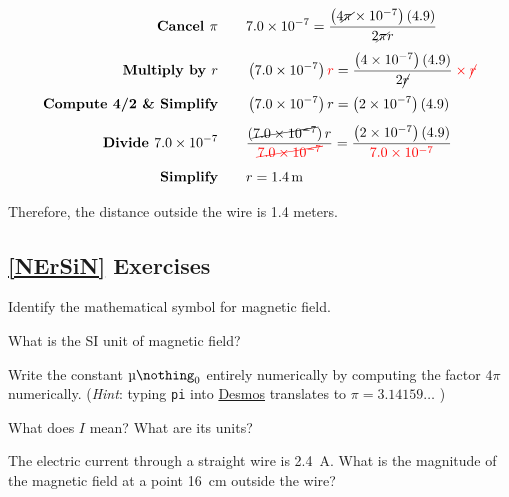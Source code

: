 \documentclass[main.tex]{subfiles}
\begin{document}
\begin{align*}
    \textbf{Cancel $\pi$} \qquad &  \num{7.0e-7} = \frac{\left(4\cancel{\pi} \times 10^{-7}\right) (4.9)}{2\cancel{\pi} r}\\[1ex]
    \textbf{Multiply by $r$} \qquad & \left(\num{7.0e-7}\right) \textcolor{red}{r} = \frac{\left(4 \times 10^{-7}\right) (4.9)}{2\cancel{r}} \mathbin{\color{red} \times} \textcolor{red}{\cancel{r}}\\[1ex]
    \textbf{Compute 4/2 \& Simplify} \qquad & \left(\num{7.0e-7}\right) r = \left(\num{2e-7}\right) (4.9)\\[1ex]
    \textbf{Divide \num{7.0e-7}} \qquad & \frac{\left(\cancel{\num{7.0e-7}}\right) r}{\textcolor{red}{\cancel{\num{7.0e-7}}}} = \frac{\left(\num{2e-7}\right) (4.9)}{\textcolor{red}{\num{7.0e-7}}}\\[1ex]
    \textbf{Simplify} \qquad & r = \SI{1.4}{m}
\end{align*}

Therefore, the distance outside the wire is 1.4 meters.

\vspace{1em}

\cyanhrule

\clearpage

\subsection*{\ref{NErSiN} Exercises}

\begin{exercise}
    Identify the mathematical symbol for magnetic field.
\end{exercise}

\begin{exercise}
    What is the SI unit of magnetic field?
\end{exercise}


\begin{exercise}
    Write the constant $\mymu_0$ entirely numerically by computing the factor $4\pi$ numerically. (\textit{Hint}: typing \texttt{pi} into \href{https://www.desmos.com/scientific}{Desmos} translates to $\pi = 3.14159\ldots$ )
\end{exercise}

\begin{exercise}
    What does $I$ mean? What are its units?
\end{exercise}

\begin{exercise} \label{eibN4h}
    The electric current through a straight wire is \SI{2.4}{A}. What is the magnitude of the magnetic field at a point \SI{16}{cm} outside the wire?
\end{exercise}
\end{document}
